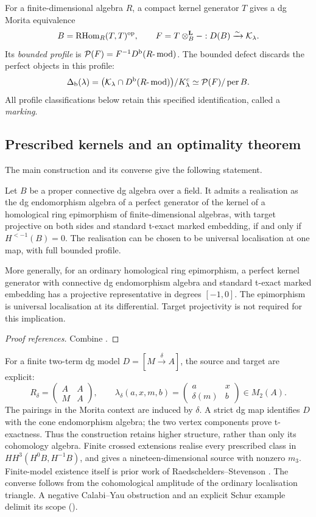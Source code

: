 \documentclass[11pt]{amsart}
\begin{document}
For a finite-dimensional algebra \(R\), a compact kernel generator \(T\) gives a dg Morita equivalence
\[
 B=\operatorname{RHom}_R(T,T)^{\mathrm{op}},\qquad
 F=T\otimes^{\mathbf L}_B-:D(B)\xrightarrow{\sim}\mathcal K_\lambda.
\]
Its \emph{bounded profile} is \(\mathcal P(F)=F^{-1}D^{\mathrm b}(R\text{-}\operatorname{mod})\). The bounded defect discards the perfect objects in this profile:
\[
 \Delta_{\mathrm b}(\lambda)=\bigl(\mathcal K_\lambda\cap D^{\mathrm b}(R\text{-}\operatorname{mod})\bigr)/K^c_\lambda
 \simeq\mathcal P(F)/\operatorname{per} B.
\]
All profile classifications below retain this specified identification, called a \emph{marking}.

\subsection*{Prescribed kernels and an optimality theorem}
The main construction and its converse give the following statement.
\begin{theorem}\label{thm:intro-Q}
Let \(B\) be a proper connective dg algebra over a field. It admits a realisation as the dg endomorphism algebra of a perfect generator of the kernel of a homological ring epimorphism of finite-dimensional algebras, with target projective on both sides and standard t-exact marked embedding, if and only if \(H^{<-1}(B)=0\). The realisation can be chosen to be universal localisation at one map, with full bounded profile.

More generally, for an ordinary homological ring epimorphism, a perfect kernel generator with connective dg endomorphism algebra and standard t-exact marked embedding has a projective representative in degrees \([-1,0]\). The epimorphism is universal localisation at its differential. Target projectivity is not required for this implication.
\end{theorem}
\begin{proof}[Proof references]
Combine .
\end{proof}

For a finite two-term dg model \(D=[M\xrightarrow{\delta}A]\), the source and target are explicit:
\[
 R_\delta=\begin{pmatrix}A&A\\M&A\end{pmatrix},\qquad
 \lambda_\delta(a,x,m,b)=\begin{pmatrix}a&x\\\delta(m)&b\end{pmatrix}\in M_2(A).
\]
The pairings in the Morita context are induced by \(\delta\). A strict dg map identifies \(D\) with the cone endomorphism algebra; the two vertex components prove t-exactness. Thus the construction retains higher structure, rather than only its cohomology algebra. Finite crossed extensions realise every prescribed class in \(HH^3(H^0B,H^{-1}B)\), and  gives a nineteen-dimensional source with nonzero \(m_3\). Finite-model existence itself is prior work of Raedschelders--Stevenson \cite[Appendix~A]{Goodbody24}. The converse follows from the cohomological amplitude of the ordinary localisation triangle. A negative Calabi--Yau obstruction and an explicit Schur example delimit its scope ().
\end{document}
